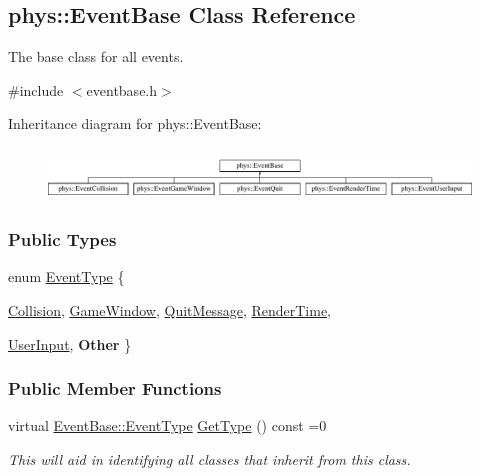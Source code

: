 \hypertarget{classphys_1_1EventBase}{
\subsection{phys::EventBase Class Reference}
\label{dd/d80/classphys_1_1EventBase}
}


The base class for all events.  




{\ttfamily \#include $<$eventbase.h$>$}

Inheritance diagram for phys::EventBase:\begin{figure}[H]
\begin{center}
\leavevmode
\includegraphics[height=1.391304cm]{dd/d80/classphys_1_1EventBase}
\end{center}
\end{figure}
\subsubsection*{Public Types}
\begin{DoxyCompactItemize}
\item 
enum \hyperlink{classphys_1_1EventBase_a5e6a8564e127f654123f0bf6a2751923}{EventType} \{ \par
\hyperlink{classphys_1_1EventBase_a5e6a8564e127f654123f0bf6a2751923adb6767503168d145497ef65a708725e5}{Collision}, 
\hyperlink{classphys_1_1EventBase_a5e6a8564e127f654123f0bf6a2751923ad094ddaa5cafeb0880c838e58b84693e}{GameWindow}, 
\hyperlink{classphys_1_1EventBase_a5e6a8564e127f654123f0bf6a2751923a84742ff55e9abdde8f5e0578d30f73a9}{QuitMessage}, 
\hyperlink{classphys_1_1EventBase_a5e6a8564e127f654123f0bf6a2751923acdfa47d279e8a1c460d557d14b85c7a5}{RenderTime}, 
\par
\hyperlink{classphys_1_1EventBase_a5e6a8564e127f654123f0bf6a2751923a320cc0817dc2c2201501b12c50c89bef}{UserInput}, 
{\bfseries Other}
 \}
\end{DoxyCompactItemize}
\subsubsection*{Public Member Functions}
\begin{DoxyCompactItemize}
\item 
virtual \hyperlink{classphys_1_1EventBase_a5e6a8564e127f654123f0bf6a2751923}{EventBase::EventType} \hyperlink{classphys_1_1EventBase_a1b3d29b6ecf30f18cc3e1825a515c508}{GetType} () const =0
\begin{DoxyCompactList}\small\item\em This will aid in identifying all classes that inherit from this class. \item\end{DoxyCompactList}\end{DoxyCompactItemize}


